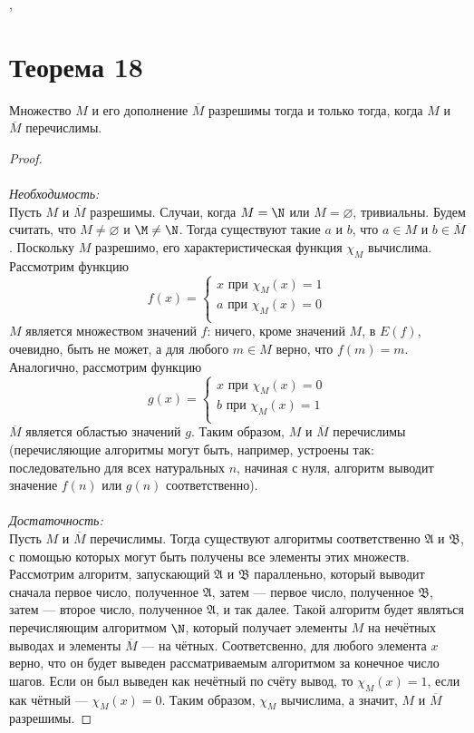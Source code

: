 \documentclass[a4paper,12pt]{article}
\begin{document}
    \sep
    \section {Теорема 18}
    \begin{theorem}
    Множество $M$ и его дополнение $\overline{M}$ разрешимы тогда и только тогда, когда $M$ и $\overline{M}$ перечислимы.
    \end{theorem}
    \begin{proof}
    \strut\\\\\textit{Необходимость:}\smallskip\\
    Пусть $M$ и $\overline{M}$ разрешимы. Случаи, когда $M=\N$ или $M=\varnothing$, тривиальны. Будем считать, что $M\ne\varnothing$ и $\M\ne\N$. Тогда существуют такие $a$ и $b$, что $a\in M$ и $b\in\overline{M}$. Поскольку $M$ разрешимо, его характеристическая функция $\chi_M$ вычислима. Рассмотрим функцию 
    $$f(x) = 
    \begin{cases}
    x \text{ при } \chi_M(x) = 1 \\
    a \text{ при } \chi_M(x) = 0 \\
    \end{cases}
    $$
    $M$ является множеством значений $f$: ничего, кроме значений $M$, в $E(f)$, очевидно, быть не может, а для любого $m\in M$ верно, что $f(m)=m$. Аналогично, рассмотрим функцию
    $$g(x) = 
    \begin{cases}
    x \text{ при } \chi_M(x) = 0 \\
    b \text{ при } \chi_M(x) = 1 \\
    \end{cases}
    $$
    $\overline{M}$ является областью значений $g$. Таким образом, $M$ и $\overline{M}$ перечислимы (перечисляющие алгоритмы могут быть, например, устроены так: последовательно для всех натуральных $n$, начиная с нуля, алгоритм выводит значение $f(n)$ или $g(n)$ соответственно).\\\\
    \textit{Достаточность:}\smallskip\\
    Пусть $M$ и $\overline{M}$ перечислимы. Тогда существуют алгоритмы соответственно $\mathfrak{A}$ и $\mathfrak{B}$, с помощью которых могут быть получены все элементы этих множеств. Рассмотрим алгоритм, запускающий $\mathfrak{A}$ и $\mathfrak{B}$ паралленьно, который выводит сначала первое число, полученное $\mathfrak{A}$, затем --- первое число, полученное $\mathfrak{B}$, затем --- второе число, полученное $\mathfrak{A}$, и так далее. Такой алгоритм будет являться перечисляющим алгоритмом $\N$, который получает элементы $M$ на нечётных выводах и элементы $\overline{M}$ --- на чётных. Соответсвенно, для любого элемента $x$ верно, что он будет выведен рассматриваемым алгоритмом за конечное число шагов. Если он был выведен как нечётный по счёту вывод, то $\chi_M(x)=1$, если как чётный --- $\chi_M(x)=0$. Таким образом, $\chi_M$ вычислима, а значит, $M$ и $\overline{M}$ разрешимы.
    \end{proof}
    
\end{document}
